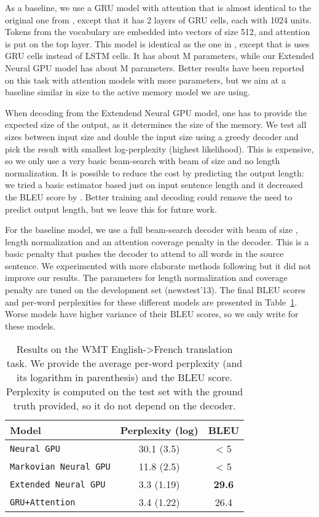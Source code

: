 \documentclass{article}
\begin{document}
As a baseline, we use a GRU model with attention that is
almost identical to the original one from \cite{bahdanau2014neural},
except that it has 2 layers of GRU cells, each with 1024 units.
Tokens from the vocabulary are embedded into vectors of size 512,
and attention is put on the top layer. This model is identical as
the one in \cite{KVparse15}, except that is uses GRU cells instead
of LSTM cells. It has about M parameters, while our
Extended Neural GPU model has about M parameters.
Better results have been reported on this task with attention
models with more parameters, but we aim at a baseline similar
in size to the active memory model we are using.

When decoding from the Extendend Neural GPU model, one has to provide
the expected size of the output, as it determines the size of
the memory. We test all sizes between input size and double the input
size using a greedy decoder and pick the result with smallest
log-perplexity (highest likelihood).  This is expensive, so we
only use a very basic beam-search with beam of size  and no
length normalization. It is possible to reduce the cost by predicting
the output length: we tried a basic estimator based just on input
sentence length and it decreased the BLEU score by . Better
training and decoding could remove the need to predict output length,
but we leave this for future work.

For the baseline model, we use a full beam-search
decoder with beam of size , length normalization and an attention
coverage penalty in the decoder. This is a basic penalty that pushes
the decoder to attend to all words in the source sentence. We experimented
with more elaborate methods following \cite{coverage} but it did not improve
our results. The parameters for length normalization
and coverage penalty are tuned on the development set (newstest'13).
The final BLEU scores and per-word perplexities for these
different models are presented in Table~\ref{tab:res}.
Worse models have higher variance of their BLEU scores,
so we only write  for these models.

\begin{table}\begin{center}
\begin{tabular}{|l||c|c|}
\hline
{\bf Model}                    & {\bf Perplexity (log)} & {\bf BLEU} \\ \hline
\texttt{Neural GPU}            & 30.1 (3.5) & < 5 \\
\texttt{Markovian Neural GPU}  & 11.8 (2.5) & < 5 \\
\texttt{Extended Neural GPU}   & 3.3 (1.19) & \textbf{29.6} \\
\hline
\texttt{GRU+Attention}  & 3.4 (1.22) & 26.4 \\
\hline
\end{tabular}
\end{center}
\caption{Results on the WMT English->French translation task.
  We provide the average per-word perplexity (and its logarithm in parenthesis) and the BLEU score.
  Perplexity is computed on the test set with the ground truth provided,
  so it do not depend on the decoder.}
\label{tab:res}
\end{table}
\end{document}
